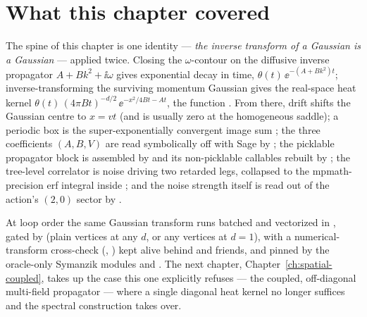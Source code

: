 \section{What this chapter covered}

The spine of this chapter is one identity --- \emph{the inverse transform of a
Gaussian is a Gaussian} --- applied twice. Closing the $\omega$-contour on the
diffusive inverse propagator $A + Bk^{2} + \ii\omega$ gives exponential decay in
time, $\theta(t)\,\ee^{-(A+Bk^{2})t}$; inverse-transforming the surviving
momentum Gaussian gives the real-space heat kernel
$\theta(t)\,(4\pi Bt)^{-d/2}\,\ee^{-x^{2}/4Bt - At}$, the function
. From there, drift shifts the Gaussian centre to
$x=vt$ (and is usually zero at the homogeneous saddle); a periodic box is the
super-exponentially convergent image sum ; the three coefficients
$(A,B,V)$ are read symbolically off  with Sage by
; the picklable propagator block is assembled by
 and its non-picklable callables rebuilt by
; the tree-level correlator is noise driving two
retarded legs, collapsed to the mpmath-precision erf integral
 inside ; and the noise strength
itself is read out of the action's $(2,0)$ sector by
.

At loop order the same Gaussian transform runs batched and vectorized in
, gated by 
(plain vertices at any $d$, or any vertices at $d=1$), with a numerical-transform
cross-check (, ) kept alive
behind  and friends, and pinned by the
oracle-only Symanzik modules  and
. The next chapter,
Chapter~\ref{ch:spatial-coupled}, takes up the case this one explicitly refuses
--- the coupled, off-diagonal multi-field propagator --- where a single diagonal
heat kernel no longer suffices and the spectral construction takes over.
